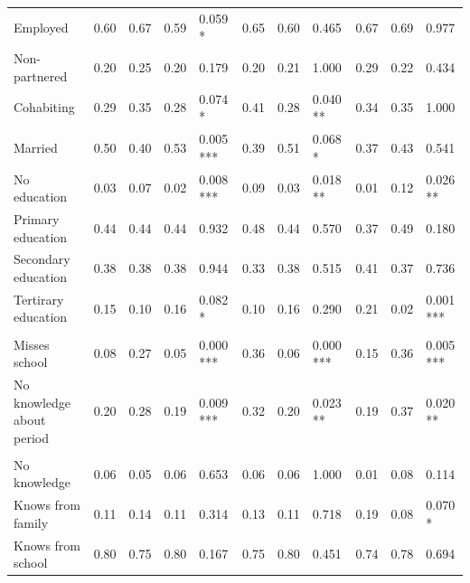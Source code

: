 \documentclass[
]{article}
\begin{document}
\begin{landscape}
\begin{table}[!h]
{\begin{threeparttable}
\begin{tabular}[t]{lllllllllll}
\hspace{1em}Employed & 0.60 & 0.67 & 0.59 & 0.059  * & 0.65 & 0.60 & 0.465 & 0.67 & 0.69 & 0.977\\
\hspace{1em}Non-partnered & 0.20 & 0.25 & 0.20 & 0.179 & 0.20 & 0.21 & 1.000 & 0.29 & 0.22 & 0.434\\
\hspace{1em}Cohabiting & 0.29 & 0.35 & 0.28 & 0.074  * & 0.41 & 0.28 & 0.040 ** & 0.34 & 0.35 & 1.000\\
\hspace{1em}Married & 0.50 & 0.40 & 0.53 & 0.005 *** & 0.39 & 0.51 & 0.068  * & 0.37 & 0.43 & 0.541\\
\hspace{1em}No education & 0.03 & 0.07 & 0.02 & 0.008 *** & 0.09 & 0.03 & 0.018 ** & 0.01 & 0.12 & 0.026 **\\
\hspace{1em}Primary education & 0.44 & 0.44 & 0.44 & 0.932 & 0.48 & 0.44 & 0.570 & 0.37 & 0.49 & 0.180\\
\hspace{1em}Secondary education & 0.38 & 0.38 & 0.38 & 0.944 & 0.33 & 0.38 & 0.515 & 0.41 & 0.37 & 0.736\\
\hspace{1em}Tertirary education & 0.15 & 0.10 & 0.16 & 0.082  * & 0.10 & 0.16 & 0.290 & 0.21 & 0.02 & 0.001 ***\\
\addlinespace[0.8em]
\multicolumn{11}{l}{\textit{Daughter-related variables}}\\
\hspace{1em}Misses school & 0.08 & 0.27 & 0.05 & 0.000 *** & 0.36 & 0.06 & 0.000 *** & 0.15 & 0.36 & 0.005 ***\\
\hspace{1em}No knowledge about period & 0.20 & 0.28 & 0.19 & 0.009 *** & 0.32 & 0.20 & 0.023 ** & 0.19 & 0.37 & 0.020 **\\
\addlinespace[0.8em]
\multicolumn{11}{l}{\textit{Daughters' knowledge about contraception}}\\
\hspace{1em}No knowledge & 0.06 & 0.05 & 0.06 & 0.653 & 0.06 & 0.06 & 1.000 & 0.01 & 0.08 & 0.114\\
\hspace{1em}Knows from family & 0.11 & 0.14 & 0.11 & 0.314 & 0.13 & 0.11 & 0.718 & 0.19 & 0.08 & 0.070  *\\
\hspace{1em}Knows from school & 0.80 & 0.75 & 0.80 & 0.167 & 0.75 & 0.80 & 0.451 & 0.74 & 0.78 & 0.694\\

\end{tabular}
\end{threeparttable}}
\end{table}
\end{landscape}
\end{document}
